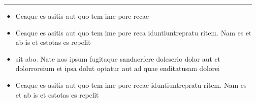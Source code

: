 \documentclass{beamer}
\begin{document}
\begin{frame}[t, fragile]
  \begin{appendixblock}
    \begin{minipage}[c]{.48\linewidth}
      \centering
      \color{fzjblue}\rule{0.9\linewidth}{0.2\paperheight}
    \end{minipage}
    \hfill
    \begin{minipage}[c]{.48\linewidth}
      \begin{itemize}
        \item Ceaque es asitis aut quo tem ime pore recae
        \item Ceaque es asitis aut quo tem ime pore reca
        iduntiuntrepratu ritem. Nam es et ab is et estotas es repelit
        \item sit abo. Nate nos ipsum fugitaque sandaerfere doleserio
        dolor aut et dolorroreium et ipsa dolut optatur aut ad quae
        enditatusam dolorei
        \item Ceaque es asitis aut quo tem ime pore recae
        iduntiuntrepratu ritem. Nam es et ab is et estotas es repelit
      \end{itemize}
    \end{minipage}
  \end{appendixblock}

  \textbf{}\\


\end{frame}
\end{document}
